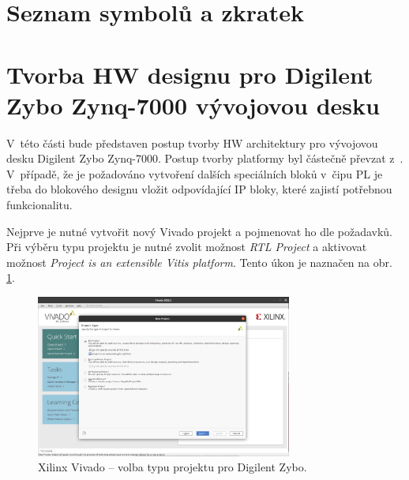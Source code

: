 \documentclass[a4paper, twoside, 11pt]{article}
\begin{document}
\newpage
\setmonofont{Times New Roman}
\printbibliography[title={{Literatura}}]	
\nocite{*}
\setmonofont{Courier}
	\appendix
	\begin{appendices}
	\section{Seznam symbolů a zkratek}

		\printglossary[type=abbreviationslist, style = myStyleAbbreviations]

		\printglossary[type=symbolslist, style =  myStyleSymbols]

		\section{Tvorba HW designu pro Digilent Zybo Zynq-7000 vývojovou desku}\label{sec:appendicies:-tvorba-hw-designu-pro-digilent-zybo-zynq-7000-vyvojovou-desku}
		V~této části bude představen postup tvorby HW architektury pro vývojovou desku Digilent Zybo Zynq-7000. Postup tvorby platformy byl částečně převzat z~\cite{hackster-vitis-2021-1-embedded-platform-for-zybo-z7-20}. V~případě, že je požadováno vytvoření dalších speciálních bloků v~čipu PL je třeba do blokového designu vložit odpovídající IP bloky, které zajistí potřebnou funkcionalitu.\par
		Nejprve je nutné vytvořit nový Vivado projekt a pojmenovat ho dle požadavků. Při výběru typu projektu je nutné zvolit možnost \textit{RTL Project} a aktivovat možnost \textit{Project is an extensible Vitis platform}. Tento úkon je naznačen na obr. \ref{fig:zybo-xilinx-vivado-flow-01}.

			\begin{figure}[htbp!]
				\centering
				\includegraphics[width=0.75\textwidth]{src/png/zybo-xilinx-vivado-flow/zybo-xilinx-vivado-flow-01.jpg}
				\caption{Xilinx Vivado – volba typu projektu pro Digilent Zybo.}
				\label{fig:zybo-xilinx-vivado-flow-01}
			\end{figure}


\end{appendices}
\end{document}
